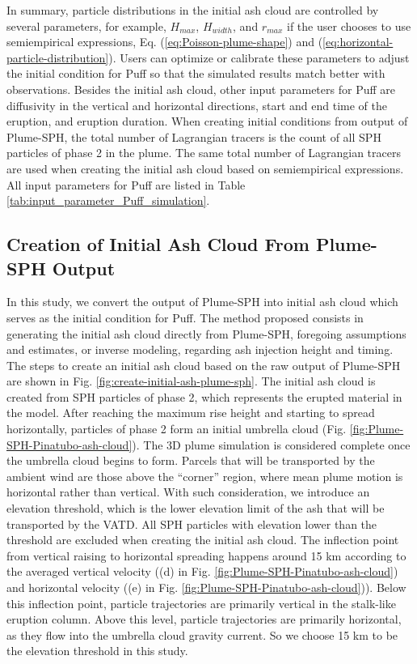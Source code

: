 \documentclass[utf8]{frontiersSCNS} %
\begin{document}
In summary, particle distributions in the initial ash cloud are controlled by several parameters, for example, $H_{max}$, $H_{width}$, and $r_{max}$ if the user chooses to use  semiempirical expressions, Eq. (\ref{eq:Poisson-plume-shape}) and (\ref{eq:horizontal-particle-distribution}). Users can optimize or calibrate these parameters to adjust the initial condition for Puff so that the simulated results match better with observations. 
Besides the initial ash cloud, other input parameters for Puff are diffusivity in the vertical and horizontal directions, start and end time of the eruption, and eruption duration. When creating initial conditions from output of Plume-SPH, the total number of Lagrangian tracers is the count of all SPH particles of phase 2 in the plume. The same total number of Lagrangian tracers are used when creating the initial ash cloud based on semiempirical expressions. All input parameters for Puff are listed in Table \ref{tab:input_parameter_Puff_simulation}.

\subsection{Creation of Initial Ash Cloud From Plume-SPH Output} \label{sec:create-initial-condition}
In this study, we convert the output of Plume-SPH into initial ash cloud which serves as the initial condition for Puff. The method proposed consists in generating the initial ash cloud directly from Plume-SPH, foregoing assumptions and estimates, or inverse modeling, regarding ash injection height and timing.
The steps to create an initial ash cloud based on the raw output of Plume-SPH are shown in Fig. \ref{fig:create-initial-ash-plume-sph}.
The initial ash cloud is created from SPH particles of phase 2, which represents the erupted material in the model. After reaching the maximum rise height and starting to spread horizontally, particles of phase 2 form an initial umbrella cloud (Fig. \ref{fig:Plume-SPH-Pinatubo-ash-cloud}). The 3D plume simulation is considered complete once the umbrella cloud begins to form. Parcels that will be transported by the ambient wind are those above the ``corner'' region, where mean plume motion is horizontal rather than vertical. With such consideration, we introduce an elevation threshold, which is the lower elevation limit of the ash that will be transported by the VATD. All SPH particles with elevation lower than the threshold are excluded when creating the initial ash cloud. The inflection point from vertical raising to horizontal spreading happens around 15 km according to the averaged vertical velocity ((d) in Fig. \ref{fig:Plume-SPH-Pinatubo-ash-cloud}) and horizontal velocity  ((e) in Fig. \ref{fig:Plume-SPH-Pinatubo-ash-cloud})).  Below this inflection point, particle trajectories are primarily vertical in the stalk-like eruption column. Above this level, particle trajectories are primarily horizontal, as they flow into the umbrella cloud gravity current. So we choose 15 km to be the elevation threshold in this study.
\end{document}
